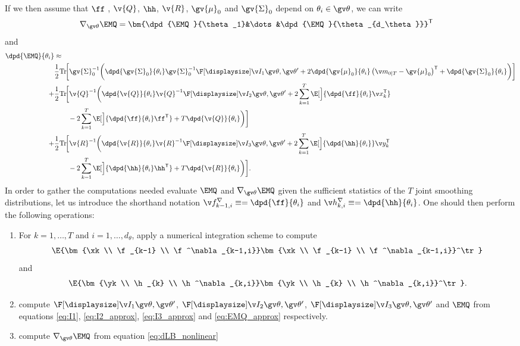 If we then assume
that $\ff$ , $\v{Q}$, $\hh$, $\v{R}$, $\gv{\mu}_0$ and $\gv{\Sigma}_0$ depend on $\theta_i\in\Th$,
we can write
\begin{align}
	\nabla_{\Th}\EMQ &= \bm{\dpd{\EMQ}{\theta_1}&\dots&\dpd{\EMQ}{\theta_{d_\theta}}}^\tr
\end{align}
and
\begin{align}
\label{eq:dLB_nonlinear}
\begin{split}
	\dpd{\EMQ}{\theta_i}&\approx\\
%	
	&\frac{1}{2}\mathrm{Tr}\!\bigg[\gv{\Sigma}_0^{-1}\bigg(
	\dpd{\gv{\Sigma}_0}{\theta_i}\gv{\Sigma}_0^{-1}
	\II{1}
	+2\dpd{\gv{\mu}_0}{\theta_i}\left(\m_{0|T}-\gv{\mu}_0\right)^\tr
	+\dpd{\gv{\Sigma}_0}{\theta_i}\bigg)\bigg]\\
%	
	+&\frac{1}{2}\mathrm{Tr}\!\bigg[\v{Q}^{-1}\bigg(\dpd{\v{Q}}{\theta_i}\v{Q}^{-1}
	\II{2}
	+2\sum_{k=1}^T\E[\Big]{\dpd{\ff}{\theta_i}\x_k^\tr}\\%
	&\qquad-2\sum_{k=1}^T\E[\Big]{\dpd{\ff}{\theta_i}\ff^\tr}
	+T\dpd{\v{Q}}{\theta_i}\bigg)\bigg]\\
%	
	+&\frac{1}{2}\mathrm{Tr}\!\bigg[\v{R}^{-1}\bigg(\dpd{\v{R}}{\theta_i}\v{R}^{-1}
	\II{3}
	+2\sum_{k=1}^T\E[\Big]{\dpd{\hh}{\theta_i}}\y_k^\tr\\
	&\qquad-2\sum_{k=1}^T\E[\Big]{\dpd{\hh}{\theta_i}\hh^\tr}
	+T\dpd{\v{R}}{\theta_i}\bigg)\bigg].
\end{split}	
\end{align}
In order to gather the computations needed evaluate $\EMQ$ and $\nabla_{\Th}\EMQ$ given the sufficient statistics
of the $T$ joint smoothing distributions, let us introduce the shorthand notation $\f^{\nabla}_{k-1,i}\equiv=\dpd{\ff}{\theta_i}$
and  $\h^\nabla_{k,i}\equiv=\dpd{\hh}{\theta_i}$.
One should then
perform the following operations:
\begin{enumerate}
  \item For $k=1,\dots,T$ and $i=1,\dots,d_\theta$, apply a numerical integration scheme to compute
%  
\begin{align}
\E{\bm{\xk \\ \f_{k-1} \\ \f^\nabla_{k-1,i}}\bm{\xk \\ \f_{k-1} \\ \f^\nabla_{k-1,i}}^\tr} 		
\end{align}
and
\begin{align}
\E{\bm{\yk \\ \h_{k} \\ \h^\nabla_{k,i}}\bm{\yk \\ \h_{k} \\ \h^\nabla_{k,i}}^\tr}. 		
\end{align}
\item compute $\II{1}$, $\II{2}$, $\II{3}$ and $\EMQ$ from equations
\eqref{eq:I1}, \eqref{eq:I2_approx}, \eqref{eq:I3_approx} and \eqref{eq:EMQ_approx} respectively.
\item compute $\nabla_{\Th}\EMQ$ from equation \eqref{eq:dLB_nonlinear}
\end{enumerate}


